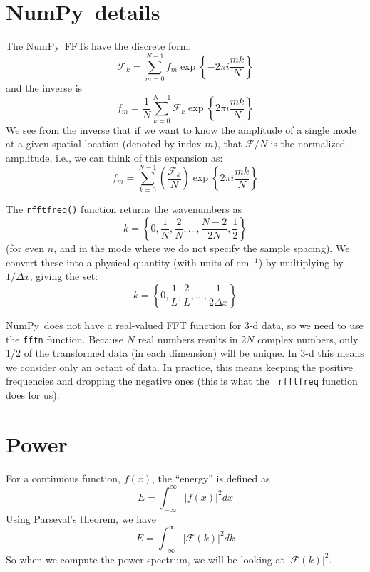 \documentclass[11pt]{article}
\newcommand{\numpy}{{\sffamily NumPy}}
\begin{document}
\section*{\numpy\ details}

The \numpy\ FFTs have the discrete form:
\begin{equation}
\mathcal{F}_k = \sum_{m=0}^{N-1} f_m \exp \left \{ -2\pi i \frac{mk}{N} \right \}
\end{equation}
and the inverse is
\begin{equation}
f_m = \frac{1}{N} \sum_{k=0}^{N-1} \mathcal{F}_k \exp \left \{ 2\pi i \frac{mk}{N} \right \}
\end{equation}
We see from the inverse that if we want to know the amplitude of a single
mode at a given spatial location (denoted by index $m$), that $\mathcal{F}/N$
is the normalized amplitude, i.e., we can think of this expansion as:
\begin{equation}
f_m = \sum_{k=0}^{N-1} \left (\frac{\mathcal{F}_k}{N} \right )
    \exp \left \{ 2\pi i \frac{mk}{N} \right \}
\end{equation}


The {\tt rfftfreq()} function returns the wavenumbers as
\begin{equation}
k = \left \{ 0, \frac{1}{N}, \frac{2}{N}, \ldots, \frac{N-2}{2N}, \frac{1}{2} \right \}
\end{equation}
(for even $n$, and in the mode where we do not specify the sample spacing).
We convert these into a physical quantity (with units of cm$^{-1}$) by
multiplying by $1/\Delta x$, giving the set:
\begin{equation}
k = \left \{ 0, \frac{1}{L}, \frac{2}{L}, \ldots, \frac{1}{2\Delta x} \right \}
\end{equation}

\numpy\ does not have a real-valued FFT function for 3-d data, so we
need to use the {\tt fftn} function.  Because $N$ real numbers results
in $2N$ complex numbers, only 1/2 of the transformed data (in each
dimension) will be unique.  In 3-d this means we consider only an
octant of data.  In practice, this means keeping the positive
frequencies and dropping the negative ones (this is what the {\tt
  rfftfreq} function does for us).




\section*{Power}

For a continuous function, $f(x)$, the ``energy'' is defined as
\begin{equation}
E = \int_{-\infty}^\infty |f(x)|^2 dx
\end{equation}
Using Parseval's theorem, we have
\begin{equation}
E = \int_{-\infty}^\infty |\mathcal{F}(k)|^2 dk
\end{equation}
%
So when we compute the power spectrum, we will be looking at
$|\mathcal{F}(k)|^2$. \\
\end{document}
